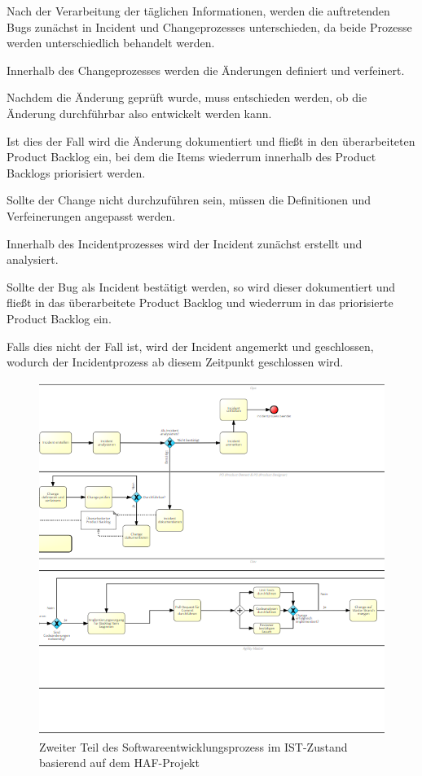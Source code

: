 Nach der Verarbeitung der täglichen Informationen, werden die auftretenden Bugs zunächst in Incident und Changeprozesses unterschieden, da beide Prozesse werden unterschiedlich behandelt werden.

Innerhalb des Changeprozesses werden die Änderungen definiert und verfeinert. 

Nachdem die Änderung geprüft wurde, muss entschieden werden, ob die Änderung durchführbar also entwickelt werden kann. 

Ist dies der Fall wird die Änderung dokumentiert und fließt in den überarbeiteten Product Backlog ein, bei dem die Items wiederrum innerhalb des Product Backlogs priorisiert werden. 

Sollte der Change nicht durchzuführen sein, müssen die Definitionen und Verfeinerungen angepasst werden.

Innerhalb des Incidentprozesses wird der Incident zunächst erstellt und analysiert.

Sollte der Bug als Incident bestätigt werden, so wird dieser dokumentiert und fließt in das überarbeitete Product Backlog und wiederrum in das priorisierte Product Backlog ein. 

Falls dies nicht der Fall ist, wird der Incident angemerkt und geschlossen, wodurch der Incidentprozess ab diesem Zeitpunkt geschlossen wird. 

\begin{figure}[h]
    \centering
    \includegraphics[scale=0.8]{Bilder/IST-Prozess_second Part.png}
    \caption{Zweiter Teil des Softwareentwicklungsprozess im IST-Zustand basierend auf dem HAF-Projekt}
\end{figure}

